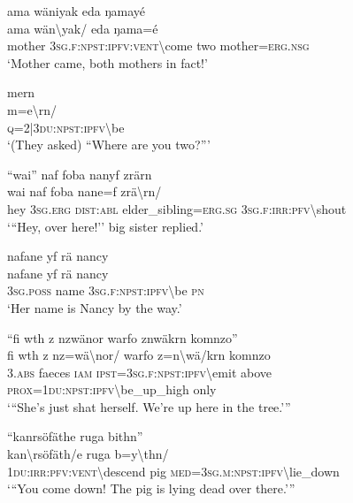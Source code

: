 \ea\label{ex:14:a2988}
ama wäniyak eda ŋamayé\\
\gll ama	wän{\textbackslash}yak/	eda	ŋama=é\\
     mother	3\textsc{sg}.\textsc{f}:\textsc{npst}:\textsc{ipfv}:\textsc{vent}{\textbackslash}come	two	mother=\textsc{erg}.\textsc{nsg}\\
\glt `Mother came, both mothers in fact!'
\z

\ea\label{ex:14:a2990}
mern\\
\gll m=e{\textbackslash}rn/\\
     \textsc{q}=2|3\textsc{du}:\textsc{npst}:\textsc{ipfv}{\textbackslash}be\\
\glt `(They asked) ``Where are you two?'''
\z

\ea\label{ex:14:a2991}
``wai'' naf foba nanyf zrärn\\
\gll wai	naf	foba	nane=f	zrä{\textbackslash}rn/\\
     hey	3\textsc{sg}.\textsc{erg}	\textsc{dist}:\textsc{abl}	elder\_sibling=\textsc{erg}.\textsc{sg}	3\textsc{sg}.\textsc{f}:\textsc{irr}:\textsc{pfv}{\textbackslash}shout\\
\glt `{``}Hey, over here!'' big sister replied.'
\z

\ea\label{ex:14:a11352}
nafane yf rä nancy\\
\gll nafane	yf	rä	nancy\\
     3\textsc{sg}.\textsc{poss}	name	3\textsc{sg}.\textsc{f}:\textsc{npst}:\textsc{ipfv}{\textbackslash}be	\textsc{pn}\\
\glt `Her name is Nancy by the way.'
\z

\ea\label{ex:14:a2993}
``fi wth z nzwänor warfo znwäkrn komnzo''\\
\gll fi	wth	z	nz=wä{\textbackslash}nor/	warfo	z=n{\textbackslash}wä/krn	komnzo\\
     3.\textsc{abs}	faeces	\textsc{iam}	\textsc{ipst}=3\textsc{sg}.\textsc{f}:\textsc{npst}:\textsc{ipfv}{\textbackslash}emit	above	\textsc{prox}=1\textsc{du}:\textsc{npst}:\textsc{ipfv}{\textbackslash}be\_up\_high	only\\
\glt `{``}She's just shat herself. We're up here in the tree.'''
\z

\ea\label{ex:14:a2995}
``kanrsöfäthe ruga bithn''\\
\gll kan{\textbackslash}rsöfäth/e	ruga	b=y{\textbackslash}thn/\\
     1\textsc{du}:\textsc{irr}:\textsc{pfv}:\textsc{vent}{\textbackslash}descend	pig	\textsc{med}=3\textsc{sg}.\textsc{m}:\textsc{npst}:\textsc{ipfv}{\textbackslash}lie\_down\\
\glt `{``}You come down! The pig is lying dead over there.'''
\z

